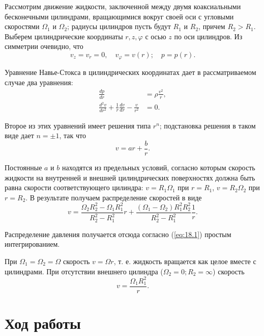 \documentclass[12pt,a4paper]{article}
\begin{document}
Рассмотрим движение жидкости, заключенной между двумя коаксиальными бесконечными цилиндрами, вращающимися вокруг своей оси с угловыми скоростями $\Omega_1$ и $\Omega_2$; радиусы цилиндров пусть будут $R_1$ и $R_2$, причем $R_2 > R_1$. Выберем цилиндрические координаты $r, z, \varphi$ с осью $z$ по оси цилиндров. Из симметрии очевидно, что
\begin{equation}
v_z = v_r = 0, \quad v_\varphi = v(r); \quad p = p(r).
\end{equation}

Уравнение Навье-Стокса в цилиндрических координатах дает в рассматриваемом случае два уравнения:
\begin{align}
\frac{dp}{dr} &= \rho \frac{v^2}{r}, \label{eq:18.1} \\
\frac{d^2v}{dr^2} + \frac{1}{r} \frac{dv}{dr} - \frac{v}{r^2} &= 0. \label{eq:18.2}
\end{align}

Второе из этих уравнений имеет решения типа $r^n$; подстановка решения в таком виде дает $n = \pm 1$, так что
\begin{equation}
v = ar + \frac{b}{r}.
\end{equation}

Постоянные $a$ и $b$ находятся из предельных условий, согласно которым скорость жидкости на внутренней и внешней цилиндрических поверхностях должна быть равна скорости соответствующего цилиндра: $v = R_1 \Omega_1$ при $r = R_1$, $v = R_2 \Omega_2$ при $r = R_2$. В результате получаем распределение скоростей в виде
\begin{equation}
\boxed{v = \frac{\Omega_2 R_2^2 - \Omega_1 R_1^2}{R_2^2 - R_1^2} r + \frac{(\Omega_1 - \Omega_2) R_1^2 R_2^2}{R_2^2 - R_1^2} \frac{1}{r}.} \label{eq:18.3}
\end{equation}

Распределение давления получается отсюда согласно (\ref{eq:18.1}) простым интегрированием.

При $\Omega_1 = \Omega_2 = \Omega$ скорость $v = \Omega r$, т. е. жидкость вращается как целое вместе с цилиндрами. При отсутствии внешнего цилиндра ($\Omega_2 = 0; R_2 = \infty$) скорость
\begin{equation}
v = \frac{\Omega_1 R_1^2}{r}.
\end{equation}

\section{Ход работы}
\end{document}
